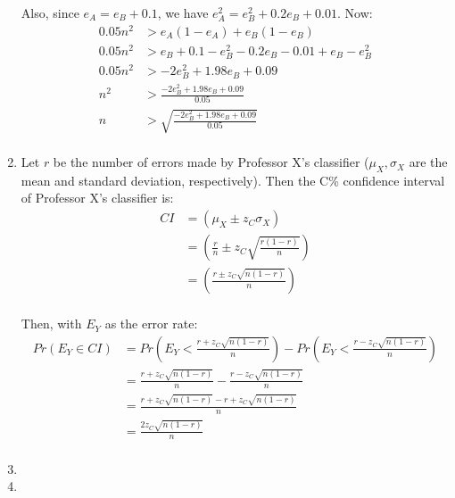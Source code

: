 \documentclass[12pt]{article}
\begin{document}
\begin{enumerate}
    Also, since $e_A=e_B+0.1$, we have $e_A^2=e_B^2+0.2e_B+0.01$. Now:
    \begin{equation}
      \begin{split}
        0.05n^2&>e_A\left(1-e_A\right)+e_B\left(1-e_B\right)\\
        0.05n^2&>e_B+0.1-e_B^2-0.2e_B-0.01+e_B-e_B^2\\
        0.05n^2&>-2e_B^2+1.98e_B+0.09\\
        n^2&>\frac{-2e_B^2+1.98e_B+0.09}{0.05}\\
        n&>\sqrt{\frac{-2e_B^2+1.98e_B+0.09}{0.05}}\\
      \end{split}
    \end{equation}
  \item
    Let $r$ be the number of errors made by Professor X's classifier
    ($\mu_X, \sigma_X$ are the mean and standard deviation, respectively). Then
    the C\% confidence interval of Professor X's classifier is:
    \begin{equation}
      \begin{split}
        CI&=\left(\mu_X\pm z_C\sigma_X\right)\\
        &=\left(\frac{r}{n}\pm z_C\sqrt{\frac{r\left(1-r\right)}{n}}\right)\\
        &=\left(\frac{r\pm z_C\sqrt{n\left(1-r\right)}}{n}\right)\\
      \end{split}
    \end{equation}

    Then, with $E_Y$ as the error rate:
    \begin{equation}
      \begin{split}
        Pr\left(E_Y\in CI\right)&
          =Pr\left(E_Y<\frac{r+z_C\sqrt{n\left(1-r\right)}}{n}\right)-
          Pr\left(E_Y<\frac{r-z_C\sqrt{n\left(1-r\right)}}{n}\right)\\
        &=\frac{r+z_C\sqrt{n\left(1-r\right)}}{n}-\frac{r-z_C\sqrt{n\left(1-r\right)}}{n}\\
        &=\frac{r+z_C\sqrt{n\left(1-r\right)}-r+z_C\sqrt{n\left(1-r\right)}}{n}\\
        &=\frac{2z_C\sqrt{n\left(1-r\right)}}{n}\\
      \end{split}
    \end{equation}
  \item
  \item
\end{enumerate}
\end{document}
